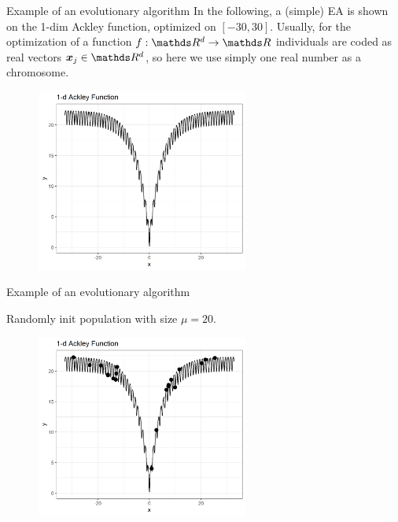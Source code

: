 \documentclass[11pt,compress,t,notes=noshow, xcolor=table]{beamer}
\begin{document}
\begin{vbframe}{Example of an evolutionary algorithm}
\footnotesize
In the following, a (simple) EA is shown on the 1-dim Ackley function, optimized on $[-30, 30]$. Usually, for the optimization of a function $f:\R^d \to \R$ individuals are coded as real vectors $\bm{x}_j \in \R^d$, so here we use simply one real number as a chromosome.

\begin{center}
\begin{figure}
  \includegraphics[height = 6cm, width = 7cm]{figure_man/1dim-ackley-func.png}
\end{figure}
\end{center}

\end{vbframe}

\begin{vbframe}{Example of an evolutionary algorithm}

Randomly init population with size $\mu = 20$.
\vspace{0.5cm}

\begin{center}
\begin{figure}
  \includegraphics[height = 6cm, width = 7cm]{figure_man/1dim-ackley-func-2.png}
\end{figure}
\end{center}

\end{vbframe}
\end{document}
